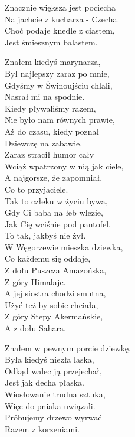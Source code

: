 \begin{multicols}{2}
Znacznie większa jest pociecha\\
Na jachcie z kucharza - Czecha.\\
Choć podaje knedle z ciastem, \\
Jest śmiesznym balastem.\\
\newcolumn

Znałem kiedyś marynarza, \\
Był najlepszy zaraz po mnie, \\
Gdyśmy w Świnoujściu chlali, \\
Nasrał mi na spodnie.\\

Kiedy pływaliśmy razem, \\
Nie było nam równych prawie, \\
Aż do czasu, kiedy poznał\\
Dziewczę na zabawie.\\

Zaraz stracił humor cały\\
Wciąż wpatrzony w nią jak ciele, \\
A najgorsze, że zapomniał, \\
Co to przyjaciele.\\

Tak to człeku w życiu bywa, \\
Gdy Ci baba na łeb wlezie, \\
Jak Cię wciśnie pod pantofel, \\
To tak, jakbyś nie żył. \\

W Węgorzewie mieszka dziewka, \\
Co każdemu się oddaje, \\
Z dołu Puszcza Amazońska, \\
Z góry Himalaje.\\

A jej siostra chodzi smutna, \\
Użyć też by sobie chciała, \\
Z góry Stepy Akermańskie, \\
A z dołu Sahara.\\
\newcolumn

Znałem w pewnym porcie dziewkę, \\
Była kiedyś niezła laska, \\
Odkąd walec ją przejechał, \\
Jest jak decha płaska.\\


Wiosłowanie trudna sztuka, \\
Więc do pniaka uwiązali.\\
Próbujemy drzewo wyrwać\\
Razem z korzeniami.\\


\end{multicols}

